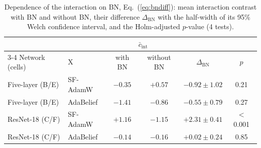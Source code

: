 \begin{table}[!t]
\caption{Dependence of the interaction on BN, Eq.~(\ref{eq:bndiff}): mean interaction contrast with BN and without BN, their difference $\Delta_{\mathrm{BN}}$ with the half-width of its 95\% Welch confidence interval, and the Holm-adjusted $p$-value (4 tests).}
\label{tab:dbn}
\centering
\footnotesize
\setlength{\tabcolsep}{5pt}
\begin{tabular}{@{}llcccc@{}}
\toprule
 & & \multicolumn{2}{c}{$\bar c_{\mathrm{int}}$} & & \\
\cmidrule(lr){3-4}
Network (cells) & X & with BN & without BN & $\Delta_{\mathrm{BN}}$ & $p$ \\
\midrule
Five-layer (B/E) & SF-AdamW & $-0.35$ & $+0.57$ & $-0.92\pm1.02$ & 0.21 \\
Five-layer (B/E) & AdaBelief & $-1.41$ & $-0.86$ & $-0.55\pm0.79$ & 0.27 \\
ResNet-18 (C/F) & SF-AdamW & $+1.16$ & $-1.15$ & $+2.31\pm0.41$ & $<$0.001 \\
ResNet-18 (C/F) & AdaBelief & $-0.14$ & $-0.16$ & $+0.02\pm0.24$ & 0.85 \\
\bottomrule
\end{tabular}
\end{table}
